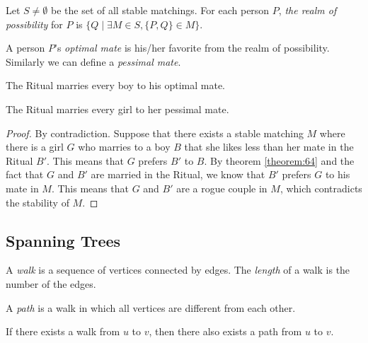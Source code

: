 \documentclass[11pt]{article}
\begin{document}
\begin{definition}
Let $S \neq \emptyset$ be the set of all stable matchings. For each person $P$, \emph{the realm of
possibility} for $P$ is $\{Q \mid \exists M \in S,\{P,Q\} \in M\}$.
\end{definition}

\begin{definition}
A person $P$'s \emph{optimal mate} is his/her favorite from the realm of possibility. Similarly we
can define a \emph{pessimal mate}.
\end{definition}

\begin{theorem} \label{theorem:64}
The Ritual marries every boy to his optimal mate.
\end{theorem}

\begin{theorem}
The Ritual marries every girl to her pessimal mate.
\end{theorem}

\begin{proof}
By contradiction. Suppose that there exists a stable matching $M$ where there is a girl $G$ who
marries to a boy $B$ that she likes less than her mate in the Ritual $B'$. This means that $G$
prefers $B'$ to $B$. By theorem \ref{theorem:64} and the fact that $G$ and $B'$ are married in the
Ritual, we know that $B'$ prefers $G$ to his mate in $M$. This means that $G$ and $B'$ are a rogue
couple in $M$, which contradicts the stability of $M$.
\end{proof}

\subsection{Spanning Trees}

\begin{definition}
A \emph{walk} is a sequence of vertices connected by edges. The \emph{length} of a walk is the number
of the edges.
\end{definition}

\begin{definition}
A \emph{path} is a walk in which all vertices are different from each other.
\end{definition}

\begin{lemma}
If there exists a walk from $u$ to $v$, then there also exists a path from $u$ to $v$.
\end{lemma}
\end{document}
